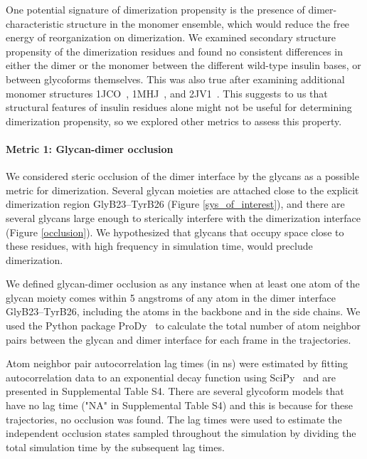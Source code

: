 \documentclass[sn-vancouver]{sn-jnl}
\begin{document}
One potential signature of dimerization propensity is the presence of dimer-characteristic structure in the monomer ensemble, which would reduce the free energy of reorganization on dimerization. We examined secondary structure propensity of the dimerization residues and found no consistent differences in either the dimer or the monomer between the different wild-type insulin bases, or between glycoforms themselves. This was also true after examining additional monomer structures 1JCO~\cite{keller2001flexibility}, 1MHJ~\cite{jorgensen1996solution}, and 2JV1~\cite{bocian2008structure}. This suggests to us that structural features of insulin residues alone might not be useful for determining dimerization propensity, so we explored other metrics to assess this property.
\paragraph{Metric 1: Glycan-dimer occlusion}
We considered steric occlusion of the dimer interface by the glycans as a possible metric for dimerization. Several glycan moieties are attached close to the explicit dimerization region GlyB23--TyrB26 (Figure \ref{sys_of_interest}), and there are several glycans large enough to sterically interfere with the dimerization interface (Figure \ref{occlusion}). We hypothesized that glycans that occupy space close to these residues, with high frequency in simulation time, would preclude dimerization.

We defined glycan-dimer occlusion as any instance when at least one atom of the glycan moiety comes within 5 angstroms of any atom in the dimer interface GlyB23--TyrB26, including the atoms in the backbone and in the side chains. We used the Python package ProDy~\cite{bakan2011prody} to calculate the total number of atom neighbor pairs between the glycan and dimer interface for each frame in the trajectories.

Atom neighbor pair autocorrelation lag times (in ns) were estimated by fitting autocorrelation data to an exponential decay function using SciPy~\cite{scipy2020pub, numpy2020pub} and are presented in Supplemental Table S4. There are several glycoform models that have no lag time ("NA" in Supplemental Table S4) and this is because for these trajectories, no occlusion was found. The lag times were used to estimate the independent occlusion states sampled throughout the simulation by dividing the total simulation time by the subsequent lag times.
\end{document}
